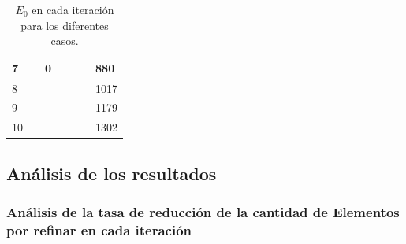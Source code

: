 \begin{table}[!ht]
\begin{tabular}{|lllllll|}
\multicolumn{1}{|l|}{7}                     & \multicolumn{1}{l|}{}                     & \multicolumn{1}{l|}{0}                       & \multicolumn{1}{l|}{}                   & \multicolumn{1}{l|}{}                   & \multicolumn{1}{l|}{}                     & 880               \\ \hline
\multicolumn{1}{|l|}{8}                     & \multicolumn{1}{l|}{}                     & \multicolumn{1}{l|}{}                        & \multicolumn{1}{l|}{}                   & \multicolumn{1}{l|}{}                   & \multicolumn{1}{l|}{}                     & 1017              \\ \hline
\multicolumn{1}{|l|}{9}                     & \multicolumn{1}{l|}{}                     & \multicolumn{1}{l|}{}                        & \multicolumn{1}{l|}{}                   & \multicolumn{1}{l|}{}                   & \multicolumn{1}{l|}{}                     & 1179              \\ \hline
\multicolumn{1}{|l|}{10}                    & \multicolumn{1}{l|}{}                     & \multicolumn{1}{l|}{}                        & \multicolumn{1}{l|}{}                   & \multicolumn{1}{l|}{}                   & \multicolumn{1}{l|}{}                     & 1302              \\ \hline
\end{tabular}
\caption{ $E_0$ en cada iteración para los diferentes casos. }
\label{table:num_els_ref}
\end{table}

\subsection{Análisis de los resultados}

\subsubsection{ Análisis de la tasa de reducción de la cantidad de Elementos por refinar en cada iteración }

